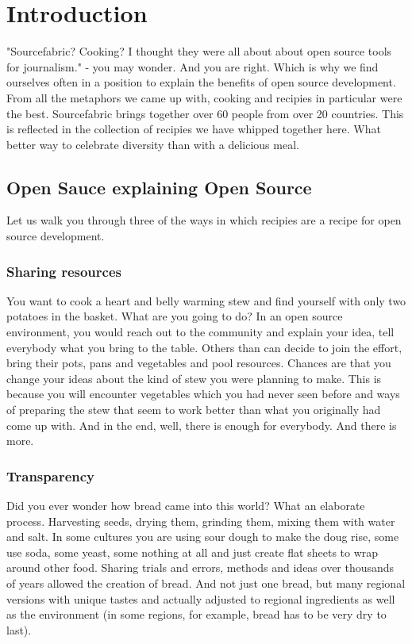 \chapter{Introduction}
"Sourcefabric? Cooking? I thought they were all about about open source tools for journalism." - you may wonder. And you are right. Which is why we find ourselves often in a position to explain the benefits of open source development. From all the metaphors we came up with, cooking and recipies in particular were the best.
Sourcefabric brings together over 60 people from over 20 countries. This is reflected in the collection of recipies we have whipped together here. What better way to celebrate diversity than with a delicious meal.
\section{Open Sauce explaining Open Source}
Let us walk you through three of the ways in which recipies are a recipe for open source development.
\subsection{Sharing resources}
You want to cook a heart and belly warming stew and find yourself with only two potatoes in the basket. What are you going to do? In an open source environment, you would reach out to the community and explain your idea, tell everybody what you bring to the table. Others than can decide to join the effort, bring their pots, pans and vegetables and pool resources. Chances are that you change your ideas about the kind of stew you were planning to make. This is because you will encounter vegetables which you had never seen before and ways of preparing the stew that seem to work better than what you originally had come up with. And in the end, well, there is enough for everybody. And there is more.
\subsection{Transparency}
Did you ever wonder how bread came into this world? What an elaborate process. Harvesting seeds, drying them, grinding them, mixing them with water and salt. In some cultures you are using sour dough to make the doug rise, some use soda, some yeast, some nothing at all and just create flat sheets to wrap around other food. Sharing trials and errors, methods and ideas over thousands of years allowed the creation of bread. And not just one bread, but many regional versions with unique tastes and actually adjusted to regional ingredients as well as the environment (in some regions, for example, bread has to be very dry to last). 
